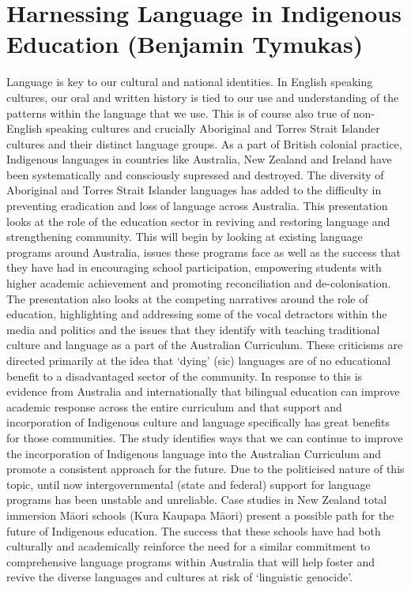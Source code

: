 \documentclass[twoside,12pt,a4paper,notitlepage]{memoir}
\begin{document}
\pagebreak
\section*{Harnessing Language in Indigenous Education (Benjamin Tymukas)}
\label{aut:tymukas}

Language is key to our cultural and national identities. In English speaking cultures, our oral and written history is tied to our use and understanding of the patterns within the language that we use. This is of course also true of non-English speaking cultures and crucially Aboriginal and Torres Strait Islander cultures and their distinct language groups. As a part of British colonial practice, Indigenous languages in countries like Australia, New Zealand and Ireland have been systematically and consciously supressed and destroyed. The diversity of Aboriginal and Torres Strait Islander languages has added to the difficulty in preventing eradication and loss of language across Australia.
This presentation looks at the role of the education sector in reviving and restoring language and strengthening community. This will begin by looking at existing language programs around Australia, issues these programs face as well as the success that they have had in encouraging school participation, empowering students with higher academic achievement and promoting reconciliation and de-colonisation. The presentation also looks at the competing narratives around the role of education, highlighting and addressing some of the vocal detractors within the media and politics and the issues that they identify with teaching traditional culture and language as a part of the Australian Curriculum. These criticisms are directed primarily at the idea that ‘dying’ (sic) languages are of no educational benefit to a disadvantaged sector of the community. In response to this is evidence from Australia and internationally that bilingual education can improve academic response across the entire curriculum and that support and incorporation of Indigenous culture and language specifically has great benefits for those communities.
The study identifies ways that we can continue to improve the incorporation of Indigenous language into the Australian Curriculum and promote a consistent approach for the future. Due to the politicised nature of this topic, until now intergovernmental (state and federal) support for language programs has been unstable and unreliable. Case studies in New Zealand total immersion Māori schools (Kura Kaupapa Māori) present a possible path for the future of Indigenous education. The success that these schools have had both culturally and academically reinforce the need for a similar commitment to comprehensive language programs within Australia that will help foster and revive the diverse languages and cultures at risk of ‘linguistic genocide’.
\end{document}
